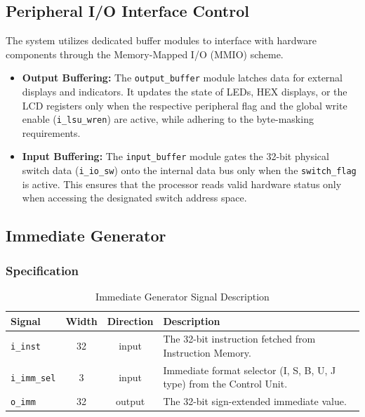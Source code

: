 \subsection{Peripheral I/O Interface Control}
The system utilizes dedicated buffer modules to interface with hardware components through the Memory-Mapped I/O (MMIO) scheme.
\begin{itemize}
	\item \textbf{Output Buffering:} The \texttt{output\_buffer} module latches data for external displays and indicators. It updates the state of LEDs, HEX displays, or the LCD registers only when the respective peripheral flag and the global write enable (\texttt{i\_lsu\_wren}) are active, while adhering to the byte-masking requirements.
	\item \textbf{Input Buffering:} The \texttt{input\_buffer} module gates the 32-bit physical switch data (\texttt{i\_io\_sw}) onto the internal data bus only when the \texttt{switch\_flag} is active. This ensures that the processor reads valid hardware status only when accessing the designated switch address space.
\end{itemize}


\newpage
\subsection{Immediate Generator}

\subsubsection{Specification}
\begin{table}[h]
	\centering
	\begin{tabular}{l c c p{7.5cm}}
		\toprule
		\textbf{Signal} & \textbf{Width} & \textbf{Direction} & \textbf{Description} \\ \midrule
		\texttt{i\_inst} & 32 & input & The 32-bit instruction fetched from Instruction Memory. \\ 
		\texttt{i\_imm\_sel} & 3 & input & Immediate format selector (I, S, B, U, J type) from the Control Unit. \\ 
		\texttt{o\_imm} & 32 & output & The 32-bit sign-extended immediate value. \\ 
		\bottomrule
	\end{tabular}
	\caption{Immediate Generator Signal Description}
	\label{tab:imm_gen_spec}
\end{table}

